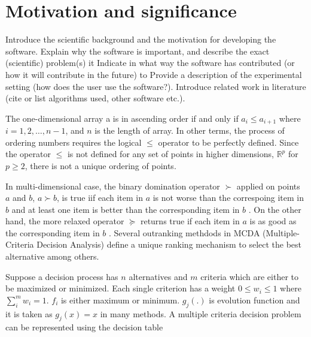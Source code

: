 \documentclass[authoryear,preprint,review,12pt]{elsarticle}
\begin{document}
\section{Motivation and significance}
\label{section::Motivation_and_Significance}

{\color{red}Introduce the scientific background and the motivation for developing the software.
Explain why the software is important, and describe the exact (scientific) problem(s) it %
Indicate in what way the software has contributed (or how it will contribute in the future) to %
Provide a description of the experimental setting (how does the user use the software?).
Introduce related work in literature (cite or list algorithms used, other software etc.).
}

The one-dimensional array a is in ascending order if and only if $a_i \le a_{i+1}$ where $i = 1, 2, \dots, n-1$, and $n$ is the length of array. In other terms, the process of ordering numbers requires the logical $\le$ operator to be perfectly defined. Since the operator $\le$ is not defined for any set of points in higher dimensions, $\mathbb{R}^p$ for $p \ge 2$, there is not a unique ordering of points.

In multi-dimensional case, the binary domination operator $\succ$ applied on points $a$ and $b$, $a \succ b$, is true iif each item in $a$ is not worse than the correspoing item in $b$ and at least one item is better than the corresponding item in $b$ \cite{Deb_2002}. On the other hand, the more relaxed operator $\succeq$ returns true if each item in $a$ is as good as the corresponding item in $b$ \cite{greco2016multiple}. Several outranking methdods in MCDA (Multiple-Criteria Decision Analysis) define a unique ranking mechanism to select the best alternative among others.

Suppose a decision process has $n$ alternatives and $m$ criteria  which are either to be maximized or minimized. Each single criterion has a weight $0 \le w_i \le 1$ where $\sum_i^m w_i = 1$. $f_i$ is either maximum or minimum. $g_j(.)$ is evolution function and it is taken as $g_j(x) = x$ in many methods. A multiple criteria decision problem can be represented using the decision table 
\end{document}
